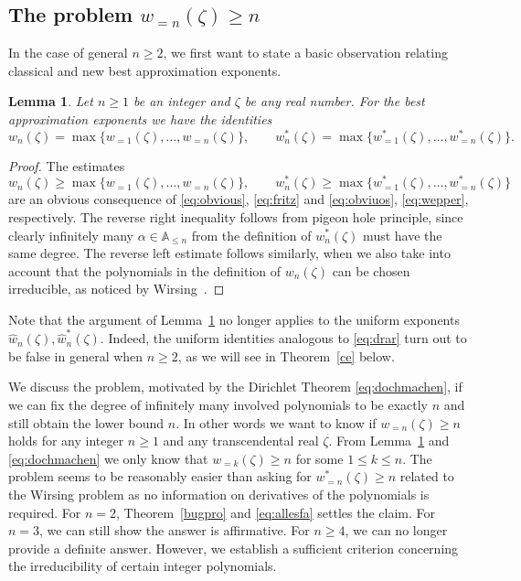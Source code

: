 \documentclass[12pt]{amsart}
\newtheorem{lemma}[theorem]{Lemma}
\theoremstyle{definition}
\begin{document}
\subsection{The problem $w_{=n}(\zeta)\geq n$} \label{natu}

In the case of general $n\geq 2$,
we first want to state a
basic observation relating classical 
and new best approximation exponents.

\begin{lemma} \label{mouz}
Let $n\geq 1$ be an integer and $\zeta$ be any real number. 
For the best approximation exponents we have
the identities
%
\begin{equation}  \label{eq:drar}
w_{n}(\zeta)= \max \{w_{=1}(\zeta),\ldots,w_{=n}(\zeta)\}, \qquad
w_{n}^{\ast}(\zeta)= \max\{ w_{=1}^{\ast}(\zeta),\ldots,w_{=n}^{\ast}(\zeta)\}.
\end{equation}
%
\end{lemma}

\begin{proof}
The estimates
%
\[
w_{n}(\zeta)\geq \max \{w_{=1}(\zeta),\ldots,w_{=n}(\zeta)\}, \qquad
w_{n}^{\ast}(\zeta)\geq \max\{ w_{=1}^{\ast}(\zeta),\ldots,w_{=n}^{\ast}(\zeta)\}
\]
%
are an obvious consequence of \eqref{eq:obvious}, \eqref{eq:fritz}
and  \eqref{eq:obviuos}, \eqref{eq:wepper}, respectively.
The reverse right inequality follows from pigeon hole principle, since clearly infinitely many $\alpha\in\mathbb{A}_{\leq n}$ 
from the definition of $w_{n}^{\ast}(\zeta)$ must have the same degree. The reverse left estimate
follows similarly, when we also take into account that
the polynomials in the definition of $w_{n}(\zeta)$ 
can be chosen irreducible, 
as noticed by Wirsing~\cite[Hilfssatz~4]{wirsing}. 
\end{proof}

Note that the argument of Lemma~\ref{mouz} no longer applies 
to the uniform 
exponents $\widehat{w}_{n}(\zeta), \widehat{w}_{n}^{\ast}(\zeta)$. 
Indeed, the uniform identities analogous to \eqref{eq:drar} 
turn out to be false in general when $n\geq 2$, as we will see
in Theorem~\ref{ce} below.

We discuss the 
problem, motivated by the Dirichlet Theorem \eqref{eq:dochmachen},
if we can fix the degree of infinitely many 
involved polynomials to be exactly
$n$ and still obtain the lower bound $n$. 
In other words we want to know if $w_{=n}(\zeta)\geq n$ holds for 
any integer $n\geq 1$ and
any transcendental real $\zeta$. 
From Lemma~\ref{mouz} and \eqref{eq:dochmachen}
we only know that $w_{=k}(\zeta)\geq n$ for some $1\leq k\leq n$.
The problem seems to be 
reasonably easier than asking for $w_{=n}^{\ast}(\zeta)\geq n$
related to the Wirsing problem as no information on
derivatives of the polynomials is required. 
For $n=2$, Theorem~\ref{bugpro}
and \eqref{eq:allesfa} settles the claim. 
For $n=3$, we can still show the answer
is affirmative.
For $n\geq 4$, we can no longer provide a definite answer.
However, we establish a sufficient criterion concerning the
irreducibility of certain integer polynomials.
\end{document}
